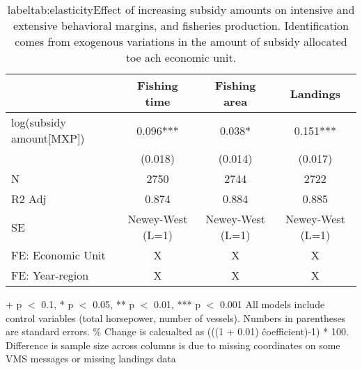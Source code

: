 \begin{table}

\caption{label{tab:elasticity}Effect of increasing subsidy amounts on intensive and extensive behavioral margins, and fisheries production. Identification comes from exogenous variations in the amount of subsidy allocated toe ach economic unit.}
\centering
\begin{threeparttable}
\begin{tabular}[t]{lccc}
\toprule
  & Fishing time & Fishing area & Landings\\
\midrule
log(subsidy amount[MXP]) & \num{0.096}*** & \num{0.038}* & \num{0.151}***\\
 & (\num{0.018}) & (\num{0.014}) & (\num{0.017})\\
\midrule
N & \num{2750} & \num{2744} & \num{2722}\\
R2 Adj & \num{0.874} & \num{0.884} & \num{0.885}\\
SE & Newey-West (L=1) & Newey-West (L=1) & Newey-West (L=1)\\
FE: Economic Unit & X & X & X\\
FE: Year-region & X & X & X\\
\bottomrule
\end{tabular}
\begin{tablenotes}
\item + p $<$ 0.1, * p $<$ 0.05, ** p $<$ 0.01, *** p $<$ 0.001 All models include control variables (total horsepower, number of vessels). Numbers in parentheses are standard errors. \% Change is calcualted as (((1 + 0.01) \^ coefficient)-1) * 100. Difference is sample size across columns is due to missing coordinates on some VMS messages or missing landings data
\end{tablenotes}
\end{threeparttable}
\end{table}
